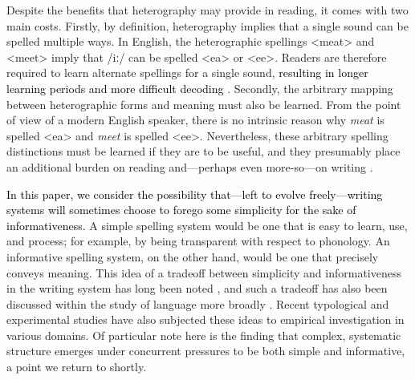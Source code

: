 \documentclass[doc,biblatex]{apa7}
\newcommand\firstrevision[1]{\textcolor{black}{#1}}
\begin{document}
Despite the benefits that heterography may provide in reading, it comes with two main costs. Firstly, by definition, heterography implies that a single sound can be spelled multiple ways. In English, the heterographic spellings <meat> and <meet> imply that /iː/ can be spelled <ea> or <ee>. Readers are therefore required to learn alternate spellings for a single sound, \firstrevision{resulting in longer learning periods and more difficult decoding \parencite{Reis:2020, Seymour:2003, Spencer:2003, Taylor:2011, Zhao:2018}}. Secondly, the arbitrary mapping between heterographic forms and meaning must also be learned. From the point of view of a modern English speaker, there is no intrinsic reason why \textit{meat} is spelled <ea> and \textit{meet} is spelled <ee>. Nevertheless, these arbitrary spelling distinctions must be learned if they are to be useful, and they presumably place an additional burden on reading and---perhaps even more-so---on writing \parencite{Frith:1979, Shankweiler:1992}.

\firstrevision{In this paper, we consider the possibility that---left to evolve freely---writing systems will sometimes choose to forego some simplicity for the sake of informativeness.} A simple spelling system would be one that is easy to learn, use, and process; for example, by being transparent with respect to phonology. An informative spelling system, on the other hand, would be one that precisely conveys meaning. This idea of a tradeoff between simplicity and informativeness in the writing system has long been noted \parencite[e.g.,][]{Coulmas:1991}, and such a tradeoff has also been discussed within the study of language more broadly \parencite[e.g.,][]{Gabelentz:1891, Zipf:1949, Martinet:1952, Rosch:1978}. Recent typological \parencite[e.g.,][]{Kemp:2018} and experimental \parencite[e.g.,][]{Kirby:2015} studies have also subjected these ideas to empirical investigation in various domains. Of particular note here is the finding that complex, systematic structure emerges under concurrent pressures to be both simple and informative, a point we return to shortly.
\end{document}
